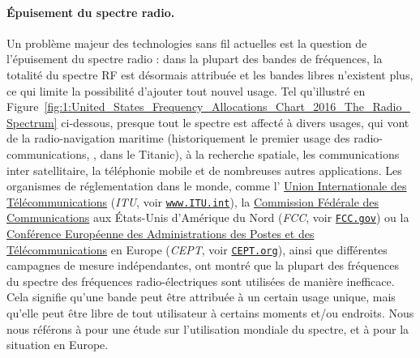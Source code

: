 \begin{resume_fr}
\paragraph{Épuisement du spectre radio.}
%
Un problème majeur des technologies sans fil actuelles est la question de l'épuisement du spectre radio :
dans la plupart des bandes de fréquences, la totalité du spectre RF est désormais attribuée et les bandes libres n'existent plus, ce qui limite la possibilité d'ajouter tout nouvel usage.
Tel qu'illustré en Figure~\ref{fig:1:United_States_Frequency_Allocations_Chart_2016_The_Radio_Spectrum} ci-dessous,
presque tout le spectre
est affecté à divers usages, qui vont de la radio-navigation maritime (historiquement le premier usage des radio-communications, \eg, dans le Titanic), à la recherche spatiale, les communications inter satellitaire, la téléphonie mobile et de nombreuses autres applications.
%
Les organismes de réglementation dans le monde, comme l'
\href{https://www.itu.int/en/Pages/default.aspx}{Union Internationale des Télécommunications} (\emph{ITU}, voir \href{https://www.itu.int/}{\texttt{www.ITU.int}}),
la \href{https://www.fcc.gov/}{Commission Fédérale des Communications} aux États-Unis d'Amérique du Nord (\emph{FCC}, voir \href{https://www.fcc.gov/}{\texttt{FCC.gov}})
ou la \href{https://cept.org}{Conférence Européenne des Administrations des Postes et des Télécommunications} en Europe (\emph{CEPT}, voir \href{https://www.CEPT.org/}{\texttt{CEPT.org}}),
ainsi que différentes campagnes de mesure indépendantes, ont montré que la plupart des fréquences du spectre des fréquences radio-électriques sont utilisées de manière inefficace.
Cela signifie qu'une bande peut être attribuée à un certain usage unique, mais qu'elle peut être libre de tout utilisateur à certains moments et/ou endroits.
Nous nous référons à \cite{patil2011survey} pour une étude sur l'utilisation mondiale du spectre, et à \cite{valenta2010survey} pour la situation en Europe.



\end{resume_fr}
